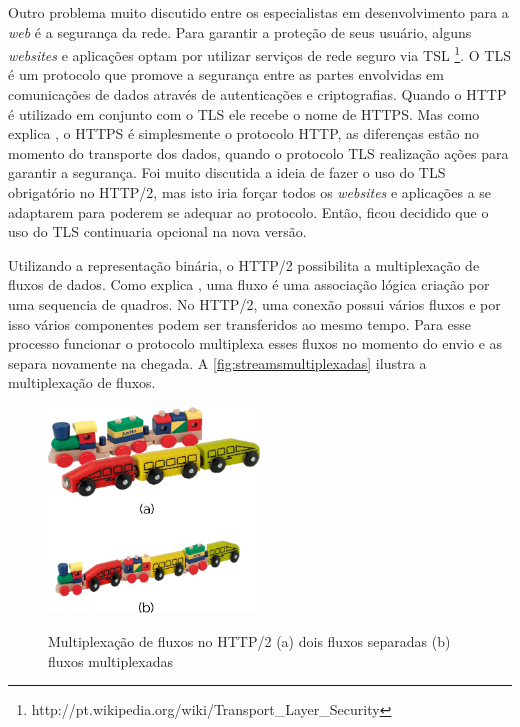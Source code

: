 Outro problema muito discutido entre os especialistas em desenvolvimento para a \textit{web} é a segurança da rede. Para garantir a proteção de seus usuário, alguns \textit{websites} e aplicações optam por utilizar serviços de rede seguro via TSL \footnote{http://pt.wikipedia.org/wiki/Transport\_Layer\_Security}. O TLS é um protocolo que promove a segurança entre as partes envolvidas em comunicações de dados através de autenticações e criptografias. Quando o HTTP é utilizado em conjunto com o TLS ele recebe o nome de HTTPS. Mas como explica , o HTTPS é simplesmente o protocolo HTTP, as diferenças estão no momento do transporte dos dados, quando o protocolo TLS realização ações para garantir a segurança. Foi muito discutida a ideia de fazer o uso do TLS obrigatório no HTTP/2, mas isto iria forçar todos os \textit{websites} e aplicações a se adaptarem para poderem se adequar ao protocolo. Então, ficou decidido que o uso do TLS continuaria opcional na nova versão.

Utilizando a representação binária, o HTTP/2 possibilita a multiplexação de fluxos de dados. Como explica , uma fluxo é uma associação lógica criação por uma sequencia de quadros. No HTTP/2, uma conexão possui vários fluxos e por isso vários componentes podem ser transferidos ao mesmo tempo. Para esse processo funcionar o protocolo multiplexa esses fluxos no momento do envio e as separa novamente na chegada. A \autoref{fig:streamsmultiplexadas} ilustra a multiplexação de fluxos.

\begin{figure}[!htb]
    \centering
    \caption{Multiplexação de fluxos no HTTP/2 (a) dois fluxos separadas (b) fluxos multiplexadas}
    \includegraphics[width=0.5\textwidth]{./04-figuras/fund-teorica/multiplexed_streams}
    \label{fig:streamsmultiplexadas}
\end{figure}

